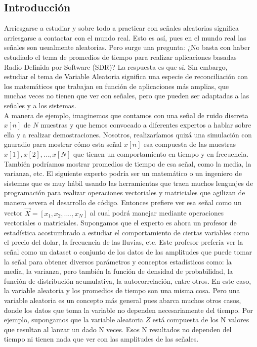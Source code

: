 \subsection{Introducción}
Arriesgarse a estudiar y sobre todo a practicar con señales aleatorias  significa arriesgarse a contactar con el mundo real. Esto es así, pues en el mundo real las señales son usualmente aleatorias. Pero surge una pregunta: ¿No basta con haber estudiado el tema de promedios de tiempo para realizar aplicaciones basadas Radio Definida por Software (SDR)? La respuesta es que sí. Sin embargo, estudiar el tema de Variable Aleatoria significa una especie de reconciliación con los matemáticos que trabajan en función de aplicaciones más amplias, que muchas veces no tienen que ver con señales, pero que pueden ser adaptadas a las señales y a los sistemas.\\ 
A manera de ejemplo, imaginemos que contamos con una señal de ruido discreta $x[n]$ de $N$ muestras y que hemos convocado a diferentes expertos a hablar sobre ella y a realizar demostraciones. Nosotros, realizaríamos quizá una simulación con gnuradio para mostrar cómo esta señal $x[n]$ esa compuesta de las muestras $x[1], x[2], ..., x[N]$ que tienen un comportamiento en tiempo y en frecuencia. También podríamos mostrar promedios de tiempo de esa señal, como la media, la varianza, etc. 
El siguiente experto podría ser un matemático o un ingeniero de sistemas que es muy hábil usando las herramientas que traen muchos lenguajes de programación para realizar operaciones vectoriales y matriciales que agilizan de manera severa el desarrollo de código. Entonces prefiere ver esa señal como un vector $\Vec{X}=[x_1, x_2, ...., x_{N}]$ al cual podrá manejar mediante operaciones vectoriales o matriciales. 
Supongamos que el experto es ahora un profesor de estadística acostumbrado a estudiar el comportamiento de ciertas variables como el precio del dolar, la frecuencia de las lluvias, etc. Este profesor prefería ver la  señal como un dataset o conjunto de los datos de las amplitudes que puede tomar la señal para obtener diversos parámetros y conceptos estadísticos como: la media, la varianza, pero también la función de densidad de probabilidad, la función de distribución acumulativa, la autocorrelación, entre otros. En este caso, la variable aleatoria y los promedios de tiempo son una misma cosa. Pero una variable aleatoria es un concepto más general pues abarca muchos otros casos, donde los datos que toma la variable no dependen necesariamente del tiempo. Por ejemplo, supongamos que la variable aleatoria $Z$ está compuesta de los N valores que resultan al lanzar un dado N veces. Esos N resultados no dependen del tiempo ni tienen nada que ver con las amplitudes de las señales.\\ 
